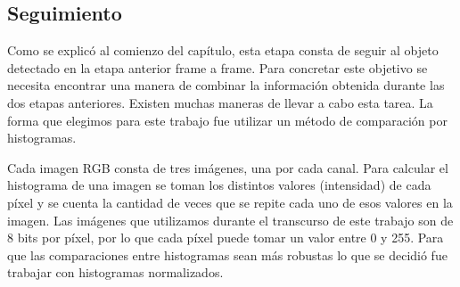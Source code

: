 \subsection{Seguimiento}\label{tracking_rgb}
Como se explicó al comienzo del capítulo, esta etapa consta de seguir al objeto detectado en la etapa anterior frame a frame. Para concretar este objetivo se necesita encontrar una manera de combinar la información obtenida durante las dos etapas anteriores. Existen muchas maneras de llevar a cabo esta tarea. La forma que elegimos para este trabajo fue utilizar un método de comparación por histogramas.

Cada imagen RGB consta de tres imágenes, una por cada canal. Para calcular el histograma de una imagen se toman los distintos valores (intensidad) de cada píxel y se cuenta la cantidad de veces que se repite cada uno de esos valores en la imagen. Las imágenes que utilizamos durante el transcurso de este trabajo son de 8 bits por píxel, por lo que cada píxel puede tomar un valor entre 0 y 255. Para que las comparaciones entre histogramas sean más robustas lo que se decidió fue trabajar con histogramas normalizados.


